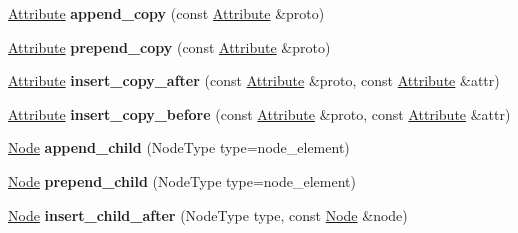 \begin{DoxyCompactItemize}
\item 
\hypertarget{classphys_1_1xml_1_1Node_a8067d9c5861a4dc89c644eded1987b7d}{
\hyperlink{classphys_1_1xml_1_1Attribute}{Attribute} {\bfseries append\_\-copy} (const \hyperlink{classphys_1_1xml_1_1Attribute}{Attribute} \&proto)}
\label{d7/d0a/classphys_1_1xml_1_1Node_a8067d9c5861a4dc89c644eded1987b7d}

\item 
\hypertarget{classphys_1_1xml_1_1Node_a875eb8b249394050178e26d978a247cf}{
\hyperlink{classphys_1_1xml_1_1Attribute}{Attribute} {\bfseries prepend\_\-copy} (const \hyperlink{classphys_1_1xml_1_1Attribute}{Attribute} \&proto)}
\label{d7/d0a/classphys_1_1xml_1_1Node_a875eb8b249394050178e26d978a247cf}

\item 
\hypertarget{classphys_1_1xml_1_1Node_a0d12c7f719d26042afb83b8045babbf0}{
\hyperlink{classphys_1_1xml_1_1Attribute}{Attribute} {\bfseries insert\_\-copy\_\-after} (const \hyperlink{classphys_1_1xml_1_1Attribute}{Attribute} \&proto, const \hyperlink{classphys_1_1xml_1_1Attribute}{Attribute} \&attr)}
\label{d7/d0a/classphys_1_1xml_1_1Node_a0d12c7f719d26042afb83b8045babbf0}

\item 
\hypertarget{classphys_1_1xml_1_1Node_af4b5824124e70eda957c410e66123896}{
\hyperlink{classphys_1_1xml_1_1Attribute}{Attribute} {\bfseries insert\_\-copy\_\-before} (const \hyperlink{classphys_1_1xml_1_1Attribute}{Attribute} \&proto, const \hyperlink{classphys_1_1xml_1_1Attribute}{Attribute} \&attr)}
\label{d7/d0a/classphys_1_1xml_1_1Node_af4b5824124e70eda957c410e66123896}

\item 
\hypertarget{classphys_1_1xml_1_1Node_a617bd9e378c04577361b8b37d7c0ac0d}{
\hyperlink{classphys_1_1xml_1_1Node}{Node} {\bfseries append\_\-child} (NodeType type=node\_\-element)}
\label{d7/d0a/classphys_1_1xml_1_1Node_a617bd9e378c04577361b8b37d7c0ac0d}

\item 
\hypertarget{classphys_1_1xml_1_1Node_a9241928c398b6403d5dc04d1f223edcd}{
\hyperlink{classphys_1_1xml_1_1Node}{Node} {\bfseries prepend\_\-child} (NodeType type=node\_\-element)}
\label{d7/d0a/classphys_1_1xml_1_1Node_a9241928c398b6403d5dc04d1f223edcd}

\item 
\hypertarget{classphys_1_1xml_1_1Node_a6c6b4225db38e4f031ee68d5c8c86377}{
\hyperlink{classphys_1_1xml_1_1Node}{Node} {\bfseries insert\_\-child\_\-after} (NodeType type, const \hyperlink{classphys_1_1xml_1_1Node}{Node} \&node)}
\label{d7/d0a/classphys_1_1xml_1_1Node_a6c6b4225db38e4f031ee68d5c8c86377}


\end{DoxyCompactItemize}
